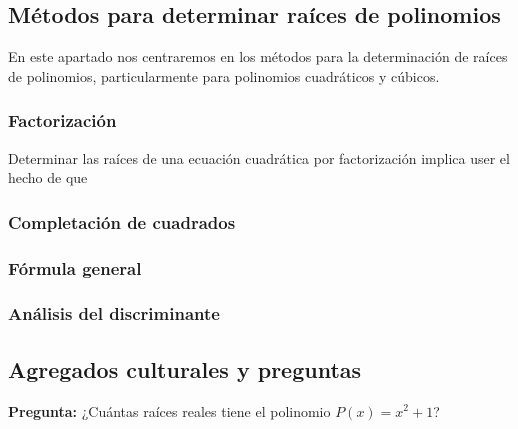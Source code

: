 \subsection{Métodos para determinar raíces de polinomios}
{
    En este apartado nos centraremos en los métodos para la determinación de raíces de polinomios, particularmente para polinomios cuadráticos y cúbicos.

    \subsubsection{Factorización}
    {
        Determinar las raíces de una ecuación cuadrática por factorización implica user el hecho de que
    }

    \subsubsection{Completación de cuadrados}
    {
    }

    \subsubsection{Fórmula general}
    {
    }

    \subsubsection{Análisis del discriminante}
    {
    }
}
\label{subsec:determinar-raices}

\subsection{Agregados culturales y preguntas}
{
    \textbf{Pregunta:} ¿Cuántas raíces reales tiene el polinomio $P(x) = x^2+1$?

}\label{subsec:agregados-culturales}
